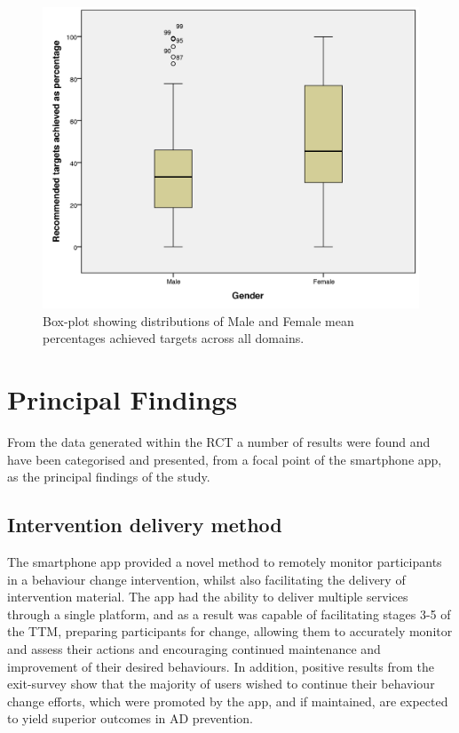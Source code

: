 \begin{figure}[h]
	\centering
    \includegraphics[scale=0.14, angle=0]{Files/prevention-study-3/figures/gender-performance.png}
  	\caption{Box-plot showing distributions of Male and Female mean percentages achieved targets across all domains.}
    \label{fig: gender-performance}
\end{figure}

\section{Principal Findings}
From the data generated within the RCT a number of results were found and have been categorised and presented, from a focal point of the smartphone app, as the principal findings of the study.

\subsection{Intervention delivery method}
The smartphone app provided a novel method to remotely monitor participants in a behaviour change intervention, whilst also facilitating the delivery of intervention material. The app had the ability to deliver multiple services through a single platform, and as a result was capable of facilitating stages 3-5 of the TTM, preparing participants for change, allowing them to accurately monitor and assess their actions and encouraging continued maintenance and improvement of their desired behaviours.
In addition, positive results from the exit-survey show that the majority of users wished to continue their behaviour change efforts, which were promoted by the app, and if maintained, are expected to yield superior outcomes in AD prevention.

